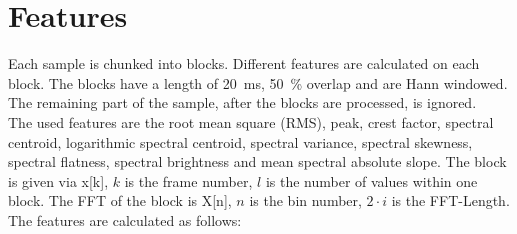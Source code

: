 \section{Features}
\label{sec:Features}
Each sample is chunked into blocks. Different features are calculated on each block. The blocks have a length of 20~ms, 50~\% overlap and are Hann windowed. The remaining part of the sample, after the blocks are processed, is ignored.\\
The used features are the root mean square (RMS), peak, crest factor, spectral centroid, logarithmic spectral centroid, spectral variance, spectral skewness, spectral flatness, spectral brightness and mean spectral absolute slope. The block is given via x[k], $k$ is the frame number, $l$ is the number of values within one block. The FFT of the block is X[n], $n$ is the bin number, $2 \cdot i$ is the FFT-Length. The features are calculated as follows:
